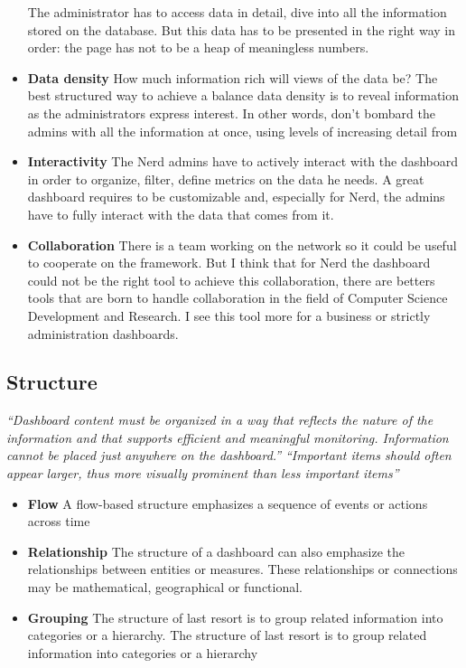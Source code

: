 \documentclass[a4paper,13pt]{report}
\begin{document}
\begin{itemize}
The administrator has to access data in detail, dive into all the information stored on the database. But this data has to be presented in the right way in order: the page has not to be a heap of meaningless numbers.
\item \textbf{Data density}\newline
 How much information rich will views of the data be? The best structured way to achieve a balance data density is to reveal information as the administrators express interest. In other words, don't bombard the admins with all the information at once, using levels of increasing detail from 
\item \textbf{Interactivity}\newline
The Nerd admins have to actively interact with the dashboard in order to organize, filter, define metrics on the data he needs. A great dashboard requires to be customizable and, especially for Nerd, the admins have to fully interact with the data that comes from it.
\item \textbf{Collaboration}\newline
There is a team working on the network so it could be useful to cooperate on the framework. But I think that for Nerd the dashboard could not be the right tool to achieve this collaboration, there are betters tools that are born to handle collaboration in the field of Computer Science Development and Research. 
I see this tool more for a business or strictly administration dashboards.
\end{itemize}
\subsection{Structure}
\emph{``Dashboard content must be organized in a way that reflects the nature of the information and that supports efficient and meaningful monitoring. Information cannot be placed just anywhere on the dashboard.''}\newline
\emph{``Important items should often appear larger, thus more visually prominent than less important items''}

\begin{itemize}
    \item \textbf{Flow}\newline
    A flow-based structure emphasizes a sequence of events or actions across time
    \item \textbf{Relationship}\newline
    The structure of a dashboard can also emphasize the relationships between entities or measures. These relationships or connections may be mathematical, geographical or functional.
    \item \textbf{Grouping}\newline
    The structure of last resort is to group related information into categories or a hierarchy. The structure of last resort is to group related information into categories or a hierarchy
\end{itemize}
\end{document}
